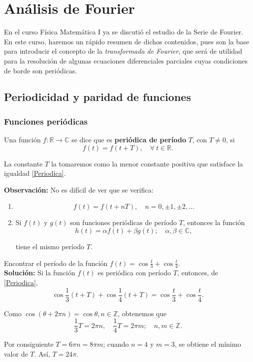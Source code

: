 \chapter{Análisis de Fourier}

En el curso Física Matemática I ya se discutió el estudio de la Serie de Fourier. En este curso, haremos un rápido resumen de dichos contenidos, pues son la base para introducir el concepto de la \emph{transformada de Fourier}, que será de utilidad para la resolución de algunas ecuaciones diferenciales parciales cuyas condiciones de borde son periódicas.

\section{Periodicidad y paridad de funciones}

\subsection{Funciones periódicas}

\begin{defi}
Una función $f: \mathbb{R} \to \mathbb{C} $ se dice que es \textbf{periódica de período} $T$, con $T\neq 0$, si 
\begin{equation}
f(t) = f(t +T ), \quad \forall \ t \in \mathbb{R}.    \label{Periodica}
\end{equation}

La constante $T$ la tomaremos como la  menor constante positiva que satisface la igualdad \eqref{Periodica}.
\end{defi}

\textbf{Observación:} No es difícil de ver que se verifica:

\begin{enumerate}
    \item $$f(t) = f(t + nT), \quad n = 0, \pm 1, \pm 2, \dots$$
    
    \item Si $f(t)$ y $g(t)$ son funciones periódicas de período $T$, entonces la función
    $$h(t) = \alpha f(t) + \beta g(t); \quad \alpha, \beta \in \mathbb{C},$$
    
    tiene el mismo período $T$.
\end{enumerate}

\newpage

\begin{ejemplo}
Encontrar el período de la función $f(t) = \cos \frac{t}{3} + \cos \frac{t}{4}$.
\\

\textbf{Solución:} Si la función $f(t)$ es periódica con período $T$, entonces, de \eqref{Periodica},
$$\cos \frac{1}{3}(t + T) + \cos \frac{1}{4}(t + T) = \cos \frac{t}{3} + \cos \frac{t}{4}.$$

Como $\cos(\theta + 2\pi n) = \cos \theta, n \in \mathbb{Z}$, obtenemos que 
$$\frac{1}{3} T = 2\pi n, \quad \frac{1}{4}T = 2\pi m; \quad n,m \in \mathbb{Z}.$$

Por consiguiente $T = 6\pi n = 8\pi m$; cuando $n = 4$ y $m=3$, se obtiene el mínimo valor de $T$. Así, $T = 24\pi$.
\end{ejemplo}

